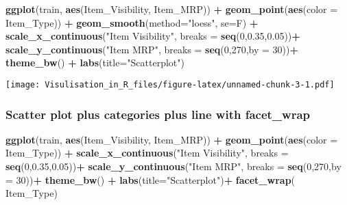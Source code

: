 \documentclass[]{article}
\newenvironment{Shaded}{\begin{snugshade}}{\end{snugshade}}
\newcommand{\KeywordTok}[1]{\textcolor[rgb]{0.13,0.29,0.53}{\textbf{#1}}}
\newcommand{\DataTypeTok}[1]{\textcolor[rgb]{0.13,0.29,0.53}{#1}}
\newcommand{\DecValTok}[1]{\textcolor[rgb]{0.00,0.00,0.81}{#1}}
\newcommand{\FloatTok}[1]{\textcolor[rgb]{0.00,0.00,0.81}{#1}}
\newcommand{\StringTok}[1]{\textcolor[rgb]{0.31,0.60,0.02}{#1}}
\newcommand{\OperatorTok}[1]{\textcolor[rgb]{0.81,0.36,0.00}{\textbf{#1}}}
\newcommand{\NormalTok}[1]{#1}
\begin{document}
\begin{Shaded}
\begin{Highlighting}[]
\KeywordTok{ggplot}\NormalTok{(train, }\KeywordTok{aes}\NormalTok{(Item_Visibility, Item_MRP)) }\OperatorTok{+}\StringTok{ }\KeywordTok{geom_point}\NormalTok{(}\KeywordTok{aes}\NormalTok{(}\DataTypeTok{color =}\NormalTok{ Item_Type)) }\OperatorTok{+}\StringTok{ }
\StringTok{  }\KeywordTok{geom_smooth}\NormalTok{(}\DataTypeTok{method=}\StringTok{"loess"}\NormalTok{, }\DataTypeTok{se=}\NormalTok{F) }\OperatorTok{+}\StringTok{ }
\StringTok{  }\KeywordTok{scale_x_continuous}\NormalTok{(}\StringTok{"Item Visibility"}\NormalTok{, }\DataTypeTok{breaks =} \KeywordTok{seq}\NormalTok{(}\DecValTok{0}\NormalTok{,}\FloatTok{0.35}\NormalTok{,}\FloatTok{0.05}\NormalTok{))}\OperatorTok{+}
\StringTok{  }\KeywordTok{scale_y_continuous}\NormalTok{(}\StringTok{"Item MRP"}\NormalTok{, }\DataTypeTok{breaks =} \KeywordTok{seq}\NormalTok{(}\DecValTok{0}\NormalTok{,}\DecValTok{270}\NormalTok{,}\DataTypeTok{by =} \DecValTok{30}\NormalTok{))}\OperatorTok{+}
\StringTok{  }\KeywordTok{theme_bw}\NormalTok{() }\OperatorTok{+}\StringTok{ }\KeywordTok{labs}\NormalTok{(}\DataTypeTok{title=}\StringTok{"Scatterplot"}\NormalTok{)}
\end{Highlighting}
\end{Shaded}

\texttt{[image: Visulisation\_in\_R\_files/figure-latex/unnamed-chunk-3-1.pdf]}

\subsubsection{Scatter plot plus categories plus line with
facet\_wrap}\label{scatter-plot-plus-categories-plus-line-with-facet_wrap}

\begin{Shaded}
\begin{Highlighting}[]
\KeywordTok{ggplot}\NormalTok{(train, }\KeywordTok{aes}\NormalTok{(Item_Visibility, Item_MRP)) }\OperatorTok{+}\StringTok{ }\KeywordTok{geom_point}\NormalTok{(}\KeywordTok{aes}\NormalTok{(}\DataTypeTok{color =}\NormalTok{ Item_Type)) }\OperatorTok{+}\StringTok{ }
\StringTok{  }\KeywordTok{scale_x_continuous}\NormalTok{(}\StringTok{"Item Visibility"}\NormalTok{, }\DataTypeTok{breaks =} \KeywordTok{seq}\NormalTok{(}\DecValTok{0}\NormalTok{,}\FloatTok{0.35}\NormalTok{,}\FloatTok{0.05}\NormalTok{))}\OperatorTok{+}
\StringTok{  }\KeywordTok{scale_y_continuous}\NormalTok{(}\StringTok{"Item MRP"}\NormalTok{, }\DataTypeTok{breaks =} \KeywordTok{seq}\NormalTok{(}\DecValTok{0}\NormalTok{,}\DecValTok{270}\NormalTok{,}\DataTypeTok{by =} \DecValTok{30}\NormalTok{))}\OperatorTok{+}
\StringTok{  }\KeywordTok{theme_bw}\NormalTok{() }\OperatorTok{+}\StringTok{ }\KeywordTok{labs}\NormalTok{(}\DataTypeTok{title=}\StringTok{"Scatterplot"}\NormalTok{)}\OperatorTok{+}\StringTok{ }\KeywordTok{facet_wrap}\NormalTok{( }\OperatorTok{~}\StringTok{ }\NormalTok{Item_Type)}
\end{Highlighting}
\end{Shaded}
\end{document}
